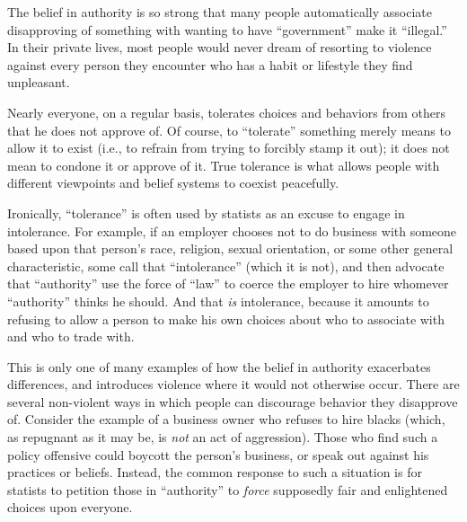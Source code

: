 \documentclass{book}
\begin{document}
The belief in authority is so strong that many people automatically associate disapproving of something with wanting to have \enquote{government} make it \enquote{illegal.} In their private lives, most people would never dream of resorting to violence against every person they encounter who has a habit or lifestyle they find unpleasant.

Nearly everyone, on a regular basis, tolerates choices and behaviors from others that he does not approve of. Of course, to \enquote{tolerate} something merely means to allow it to exist (i.e., to refrain from trying to forcibly stamp it out); it does not mean to condone it or approve of it. True tolerance is what allows people with different viewpoints and belief systems to coexist peacefully.

Ironically, \enquote{tolerance} is often used by statists as an excuse to engage in intolerance. For example, if an employer chooses not to do business with someone based upon that person's race, religion, sexual orientation, or some other general characteristic, some call that \enquote{intolerance} (which it is not), and then advocate that \enquote{authority} use the force of \enquote{law} to coerce the employer to hire whomever \enquote{authority} thinks he should. And that \emph{is} intolerance, because it amounts to refusing to allow a person to make his own choices about who to associate with and who to trade with.

This is only one of many examples of how the belief in authority exacerbates differences, and introduces violence where it would not otherwise occur. There are several non-violent ways in which people can discourage behavior they disapprove of. Consider the example of a business owner who refuses to hire blacks (which, as repugnant as it may be, is \emph{not} an act of aggression). Those who find such a policy offensive could boycott the person's business, or speak out against his practices or beliefs. Instead, the common response to such a situation is for statists to petition those in \enquote{authority} to \emph{force} supposedly fair and enlightened choices upon everyone.
\end{document}
